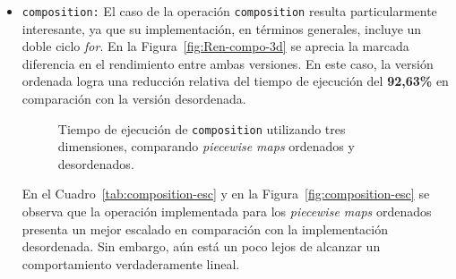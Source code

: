 \begin{itemize}
        \item \texttt{composition:} 
        El caso de la operación \texttt{composition} resulta particularmente interesante, 
        ya que su implementación, en términos generales, incluye un doble ciclo \textit{for}. En la 
        Figura~\ref{fig:Ren-compo-3d} se aprecia la marcada diferencia en el rendimiento 
        entre ambas versiones. En este caso, la versión ordenada logra una reducción 
        relativa del tiempo de ejecución del \textbf{92{,}63\%} en comparación con la 
        versión desordenada.



   \begin{figure}[htbp]
          \centering
          \caption{Tiempo de ejecución de \texttt{composition} utilizando tres dimensiones, comparando \textit{piecewise maps} ordenados y desordenados.}
          \label{fig:Ren-concat-3d}
        \end{figure}

    En el Cuadro~\ref{tab:composition-esc} y en la Figura~\ref{fig:composition-esc} 
    se observa que la operación implementada para los \textit{piecewise maps} ordenados presenta un mejor escalado en comparación con la implementación desordenada. 
    Sin embargo, aún está un poco lejos de alcanzar un comportamiento verdaderamente lineal.




\end{itemize}
